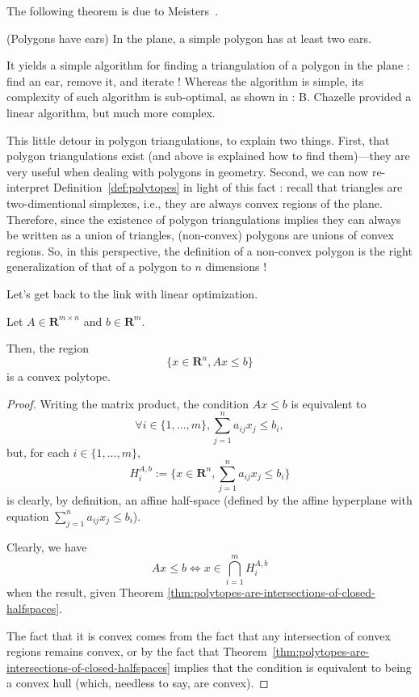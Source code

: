 The following theorem is due to Meisters~\cite{meisters1975}.

\begin{theorem}(Polygons have ears)
    In the plane, a simple polygon has at least two ears.
\end{theorem}

\begin{remark}
    It yields a simple algorithm for finding a triangulation of a polygon in the plane : find an ear, remove it, and iterate ! Whereas the algorithm is simple, its complexity of such algorithm is sub-optimal, as shown in \cite{chazelle1991} : B. Chazelle provided a linear algorithm, but much more complex.
\end{remark}

\begin{remark}
    This little detour in polygon triangulations, to explain two things. First, that polygon triangulations exist (and above is explained how to find them)---they are very useful when dealing with polygons in geometry. Second, we can now re-interpret Definition~\ref{def:polytopes} in light of this fact : recall that triangles are two-dimentional simplexes, i.e., they are always convex regions of the plane. Therefore, since the existence of polygon triangulations implies they can always be written as a union of triangles, (non-convex) polygons are unions of convex regions. So, in this perspective, the definition of a non-convex polygon is the right generalization of that of a polygon to $ n $ dimensions !
\end{remark}

Let's get back to the link with linear optimization.

\begin{theorem}
    Let $ A \in \mathbf R^{m \times n} $ and $ b \in \mathbf R^m $.

    Then, the region
    \[
        \{ x \in \mathbf R^n, Ax \leqslant b \}
    \]
    is a convex polytope.
\end{theorem}

\begin{proof}
    Writing the matrix product, the condition $ Ax \leqslant b $ is equivalent to
    \[
        \forall i \in \{ 1, ..., m \}, \sum_{j=1}^n a_{ij} x_j \leqslant b_i,
    \]
    but, for each $ i \in \{ 1, ..., m \} $,
    \[
        H_i^{A,b} := \{ x \in \mathbf R^n, \sum_{j=1}^n a_{ij} x_j \leqslant b_i \} 
    \]
    is clearly, by definition, an affine half-space (defined by the affine hyperplane with equation $ \sum\limits _{j=1}^na_{ij} x_j \leqslant b_i $).

    Clearly, we have
    \[
        Ax \leqslant b \iff x \in \bigcap_{i=1}^m H_i^{A,b}
    \]
    when the result, given Theorem \ref{thm:polytopes-are-intersections-of-closed-halfspaces}.

    The fact that it is convex comes from the fact that any intersection of convex regions remains convex, or by the fact that Theorem~\ref{thm:polytopes-are-intersections-of-closed-halfspaces} implies that the condition is equivalent to being a convex hull (which, needless to say, are convex).
\end{proof}

